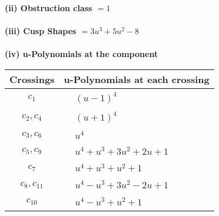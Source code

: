 \documentclass[1p]{elsarticle_modified}
\theoremstyle{definition}
\begin{document}
\flushleft \textbf{(ii) Obstruction class $= 1$}\\~\\
\flushleft \textbf{(iii) Cusp Shapes $= 3 u^3+5 u^2-8$}\\~\\
\newpage\renewcommand{\arraystretch}{1}
\flushleft \textbf{(iv) u-Polynomials at the component}\newline \\
\begin{tabular}{m{50pt}|m{274pt}}
Crossings & \hspace{64pt}u-Polynomials at each crossing \\
\hline $$\begin{aligned}c_{1}\end{aligned}$$&$\begin{aligned}
&(u-1)^4
\end{aligned}$\\
\hline $$\begin{aligned}c_{2},c_{4}\end{aligned}$$&$\begin{aligned}
&(u+1)^4
\end{aligned}$\\
\hline $$\begin{aligned}c_{3},c_{6}\end{aligned}$$&$\begin{aligned}
&u^4
\end{aligned}$\\
\hline $$\begin{aligned}c_{5},c_{9}\end{aligned}$$&$\begin{aligned}
&u^4+u^3+3 u^2+2 u+1
\end{aligned}$\\
\hline $$\begin{aligned}c_{7}\end{aligned}$$&$\begin{aligned}
&u^4+u^3+u^2+1
\end{aligned}$\\
\hline $$\begin{aligned}c_{8},c_{11}\end{aligned}$$&$\begin{aligned}
&u^4- u^3+3 u^2-2 u+1
\end{aligned}$\\
\hline $$\begin{aligned}c_{10}\end{aligned}$$&$\begin{aligned}
&u^4- u^3+u^2+1
\end{aligned}$\\
\hline
\end{tabular}\\~\\
\end{document}
